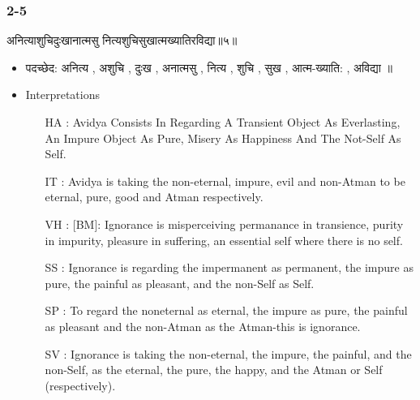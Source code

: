 \begin{frame}[fragile]\frametitle{2-5}
\begin{sanskrit}
अनित्याशुचिदुःखानात्मसु नित्यशुचिसुखात्मख्यातिरविद्या॥५॥
\end{sanskrit}

	\begin{itemize}
	\item पदच्छेद: अनित्य , अशुचि , दुःख , अनात्मसु , नित्य , शुचि , सुख , आत्म-ख्याति: , अविद्या ॥
	\item Interpretations
		\begin{itemize}
		\item [HA]: Avidya Consists In Regarding A Transient Object As Everlasting, An Impure Object As Pure, Misery As Happiness And The Not-Self As Self.
		\item [IT]: Avidya is taking the non-eternal, impure, evil and non-Atman to be eternal, pure, good and Atman respectively.
		\item [VH]: [BM]: Ignorance is misperceiving permanance in transience, purity in impurity, pleasure in suffering, an essential self where there is no self.
		\item [SS]: Ignorance is regarding the impermanent as permanent, the impure as pure, the painful as pleasant, and the non-Self as Self.
		\item [SP]: To regard the noneternal as eternal, the impure as pure, the painful as pleasant and the non-Atman as the Atman-this is ignorance.
		\item [SV]: Ignorance is taking the non-eternal, the impure, the painful, and the non-Self, as the eternal, the pure, the happy, and the Atman or Self (respectively). 
		\end{itemize}
	\end{itemize}
	
\end{frame}



